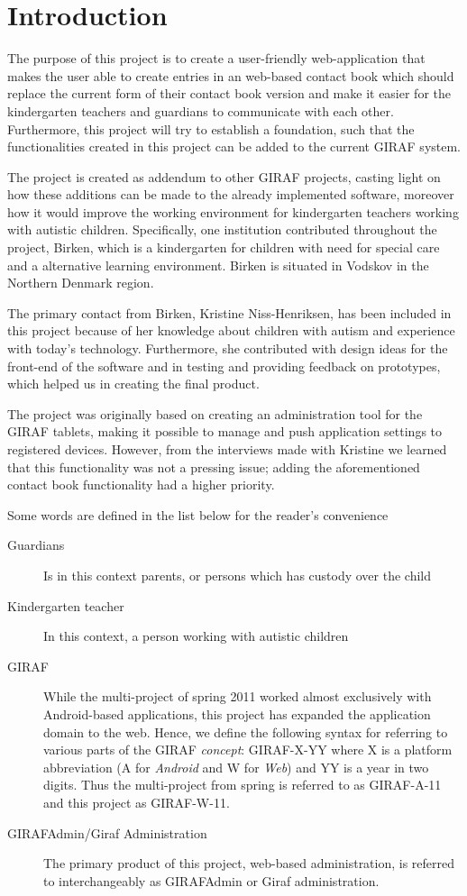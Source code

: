 \chapter{Introduction}

The purpose of this project is to create a user-friendly web-application that makes the user able to create entries in an web-based contact book which should replace the current form of their contact book version and make it easier for the kindergarten teachers and guardians to communicate with each other. Furthermore, this project will try to establish a foundation, such that the functionalities created in this project can be added to the current GIRAF system. 

The project is created as addendum to other GIRAF projects, casting light on how these additions can be made to the already implemented software, moreover how it would improve the working environment for kindergarten teachers working with autistic children. 
Specifically, one institution contributed throughout the project, Birken, which is a kindergarten for children with need for special care and a alternative learning environment. Birken is situated in Vodskov in the Northern Denmark region.

The primary contact from Birken, Kristine Niss-Henriksen, has been included in this project because of her knowledge about children with autism and experience with today's technology. Furthermore, she contributed with design ideas for the front-end of the software and in testing and providing feedback on prototypes, which helped us in creating the final product.

The project was originally based on creating an administration tool for the GIRAF tablets, making it possible to manage and push application settings to registered devices. However, from the interviews made with Kristine we learned that this functionality was not a pressing issue; adding the aforementioned contact book functionality had a higher priority.  

Some words are defined in the list below for the reader's convenience
\begin{description}
\item[Guardians] Is in this context parents, or persons which has custody over the child
\item[Kindergarten teacher] In this context, a person working with autistic children
\item[GIRAF] While the multi-project of spring 2011 worked almost exclusively with Android-based applications, this project has expanded the application domain to the web. Hence, we define the following syntax for referring to various parts of the GIRAF \emph{concept}: GIRAF-X-YY where X is a platform abbreviation (A for \emph{Android} and W for \emph{Web}) and YY is a year in two digits. Thus the multi-project from spring is referred to as GIRAF-A-11 and this project as GIRAF-W-11.
\item[GIRAFAdmin/Giraf Administration] The primary product of this project, web-based administration, is referred to interchangeably as GIRAFAdmin or Giraf administration.
\end{description}